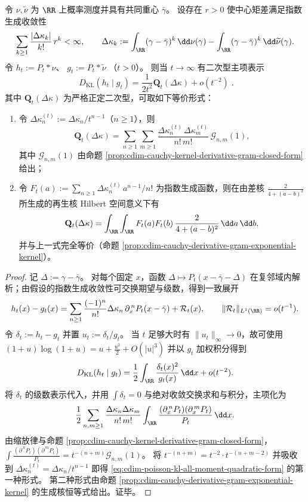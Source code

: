 \begin{proposition}\label{prop:cdim-poisson-kl-all-moment-quadratic-form}
令 \(\nu,\widetilde\nu\) 为 \(\RR\) 上概率测度并具有共同重心 \(\bar\gamma\)。
设存在 \(r>0\) 使中心矩差满足指数生成收敛性
\[
\sum_{k\ge 1}\frac{|\Delta\kappa_k|}{k!}\,r^k<\infty,
\qquad
\Delta\kappa_k
:=\int_{\RR}(\gamma-\bar\gamma)^k\,\dd\nu(\gamma)
-\int_{\RR}(\gamma-\bar\gamma)^k\,\dd\widetilde\nu(\gamma).
\]
令
\(
h_t:=P_t*\nu
\)、
\(
g_t:=P_t*\widetilde\nu
\)
（\(t>0\)）。
则当 \(t\to\infty\) 有二次型主项表示
\begin{equation}\label{eq:cdim-poisson-kl-all-moment-quadratic-form}
\boxed{\;
D_{\mathrm{KL}}(h_t\mid g_t)
=\frac{1}{2t^{2}}\mathbf Q_t(\Delta\kappa)+o(t^{-2})\; }.
\end{equation}
其中 \(\mathbf Q_t(\Delta\kappa)\) 为严格正定二次型，可取如下等价形式：
\begin{enumerate}
  \item 令 \(\Delta\kappa^{(t)}_n:=\Delta\kappa_n/t^{n-1}\)（\(n\ge 1\)），则
  \[
  \mathbf Q_t(\Delta\kappa)
  =\sum_{n\ge 1}\sum_{m\ge 1}\frac{\Delta\kappa^{(t)}_n\,\Delta\kappa^{(t)}_m}{n!\,m!}\,\mathcal G_{n,m}(1),
  \]
  其中 \(\mathcal G_{n,m}(1)\) 由命题 \ref{prop:cdim-cauchy-kernel-derivative-gram-closed-form} 给出；
  \item 令
  \(
  F_t(a):=\sum_{n\ge 1}\Delta\kappa^{(t)}_n\,a^{n-1}/n!
  \)
  为指数生成函数，则在由差核 \(\frac{2}{4+(a-b)^2}\) 所生成的再生核 Hilbert 空间意义下有
  \[
  \mathbf Q_t(\Delta\kappa)
  =\int_{\RR}\int_{\RR}F_t(a)F_t(b)\,\frac{2}{4+(a-b)^2}\,\dd a\,\dd b,
  \]
  并与上一式完全等价（命题 \ref{prop:cdim-cauchy-derivative-gram-exponential-kernel}）。
\end{enumerate}
\end{proposition}
\begin{proof}
记 \(\Delta:=\gamma-\bar\gamma\)。
对每个固定 \(x\)，函数 \(\Delta\mapsto P_t(x-\bar\gamma-\Delta)\) 在复邻域内解析；由假设的指数生成收敛性可交换期望与级数，得到一致展开
\[
h_t(x)-g_t(x)
=\sum_{n\ge 1}\frac{(-1)^n}{n!}\Delta\kappa_n\,\partial_x^{\,n}P_t(x-\bar\gamma)+\mathcal R_t(x),
\qquad
\|\mathcal R_t\|_{L^1(\RR)}=o(t^{-1}).
\]
令 \(\delta_t:=h_t-g_t\) 并置 \(u_t:=\delta_t/g_t\)。
当 \(t\) 足够大时有 \(\|u_t\|_\infty\to 0\)，故可使用
\(
(1+u)\log(1+u)=u+\frac{u^2}{2}+O(|u|^3)
\)
并以 \(g_t\) 加权积分得到
\[
D_{\mathrm{KL}}(h_t\mid g_t)
=\frac12\int_{\RR}\frac{\delta_t(x)^2}{g_t(x)}\,\dd x+o(t^{-2}).
\]
将 \(\delta_t\) 的级数表示代入，并用 \(\int \delta_t=0\) 与绝对收敛交换求和与积分，主项化为
\[
\frac12\sum_{n,m\ge 1}\frac{\Delta\kappa_n\Delta\kappa_m}{n!\,m!}
\int_{\RR}\frac{(\partial_x^{\,n}P_t)(\partial_x^{\,m}P_t)}{P_t}\,\dd x.
\]
由缩放律与命题 \ref{prop:cdim-cauchy-kernel-derivative-gram-closed-form}，
\(
\int \frac{(\partial^{\,n}P_t)(\partial^{\,m}P_t)}{P_t}
=t^{-(n+m)}\mathcal G_{n,m}(1)
\)。
将 \(t^{-(n+m)}=t^{-2}\cdot t^{-(n+m-2)}\) 并吸收到 \(\Delta\kappa^{(t)}_n=\Delta\kappa_n/t^{n-1}\) 即得 \eqref{eq:cdim-poisson-kl-all-moment-quadratic-form} 的第一种形式。
第二种形式由命题 \ref{prop:cdim-cauchy-derivative-gram-exponential-kernel} 的生成核恒等式给出。证毕。
\end{proof}

